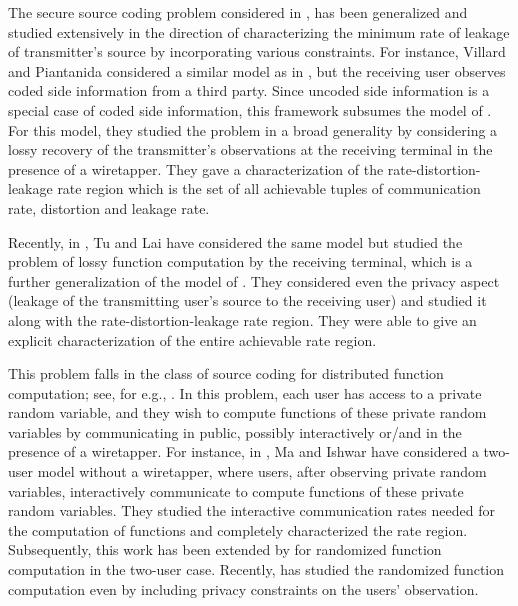 The secure source coding problem considered in \cite{vinod07},  has been generalized and studied extensively in the direction of characterizing the minimum rate of leakage of transmitter's source \cite{gunduz08, villard13} by incorporating various constraints. For instance, Villard and Piantanida \cite{villard13} considered a similar model as in \cite{vinod07}, but the receiving user observes  coded side information from a third party. Since uncoded side information is a special case of coded side information, this framework subsumes the model of \cite{vinod07}. For this model, they studied the problem in a broad generality by considering a lossy recovery of the transmitter's observations at the receiving terminal in the presence of a wiretapper. They gave a characterization of the rate-distortion-leakage rate region which is the set of all achievable tuples of communication rate, distortion and leakage rate.

Recently, in \cite{wenwentu19},  Tu and Lai have considered the same model but studied the problem of lossy function computation by the receiving terminal, which is a further generalization of the model of \cite{villard13}. They considered even the privacy aspect (leakage of the transmitting user's source to the receiving user) and studied it along with the rate-distortion-leakage rate region. They were able to give an explicit characterization of the entire achievable rate region.


This problem falls in the class of source coding for distributed function computation; see, for e.g., \cite{han_dichotomy, alon_roche, ma11, tyagi11, wenwentu19}. In this problem, each user has access to a private random variable, and they wish to compute functions of these private random variables by communicating in public, possibly interactively or/and in the presence of a wiretapper. For instance, in \cite{ma11},  Ma and Ishwar have considered a two-user model without a wiretapper, where users, after observing private random variables, interactively communicate to compute functions of these private random variables. They studied the interactive communication rates needed for the computation of functions and completely characterized the rate region. Subsequently, this work has been extended  by \cite{yassaee15} for randomized function computation in the two-user case. Recently, \cite{data_interactive_securefunction} has studied the randomized function computation even by including privacy constraints on the users' observation.

